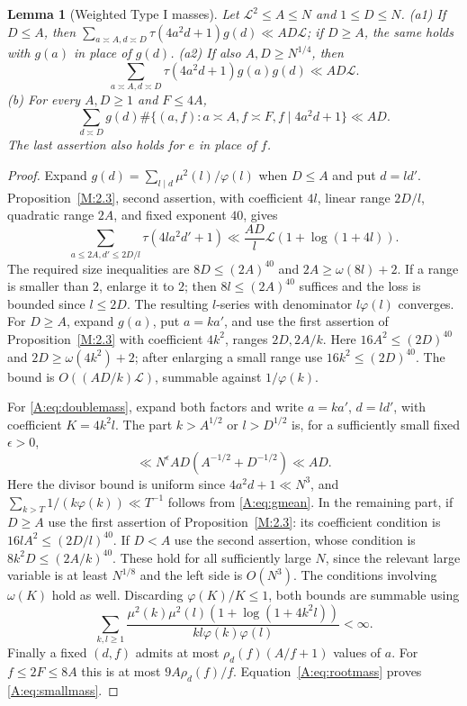 \documentclass[10pt,reqno]{amsart}
\newtheorem{lemma}[theorem]{Lemma}
\theoremstyle{definition}
\numberwithin{equation}{section}
\newcommand{\cL}{\mathcal L}
\begin{document}
\begin{lemma}[Weighted Type I masses]\label{L:8.4}
Let $\cL^2\le A\le N$ and $1\le D\le N$.
\textup{(a1)} If $D\le A$, then
$\sum_{a\asymp A,d\asymp D}\tau(4a^2d+1)g(d)\ll AD\cL$;
if $D\ge A$, the same holds with $g(a)$ in place of $g(d)$.
\textup{(a2)} If also $A,D\ge N^{1/4}$, then
\begin{equation}\label{A:eq:doublemass}
 \sum_{a\asymp A,d\asymp D}\tau(4a^2d+1)g(a)g(d)\ll AD\cL.
\end{equation}
\textup{(b)} For every $A,D\ge1$ and $F\le4A$,
\begin{equation}\label{A:eq:smallmass}
 \sum_{d\asymp D}g(d)\#\{(a,f):a\asymp A,f\asymp F,
                                    f\mid4a^2d+1\}\ll AD.
\end{equation}
The last assertion also holds for $e$ in place of $f$.
\end{lemma}
\begin{proof}
Expand $g(d)=\sum_{l\mid d}\mu^2(l)/\varphi(l)$ when $D\le A$ and put
$d=ld'$. Proposition~\ref{M:2.3}, second assertion, with coefficient $4l$,
linear range $2D/l$, quadratic range $2A$, and fixed exponent $40$, gives
\[
 \sum_{a\le2A,d'\le2D/l}\tau(4la^2d'+1)
       \ll\frac{AD}{l}\cL(1+\log(1+4l)).
\]
The required size inequalities are $8D\le(2A)^{40}$ and
$2A\ge\omega(8l)+2$. If a range is smaller than $2$, enlarge it to $2$;
then $8l\le(2A)^{40}$ suffices and the loss is bounded since $l\le2D$.
The resulting $l$-series with denominator $l\varphi(l)$ converges.
For $D\ge A$, expand $g(a)$, put $a=ka'$, and use the first assertion of
Proposition~\ref{M:2.3} with coefficient $4k^2$, ranges $2D,2A/k$.
Here $16A^2\le(2D)^{40}$ and $2D\ge\omega(4k^2)+2$; after enlarging a
small range use $16k^2\le(2D)^{40}$. The bound is
$O((AD/k)\cL)$, summable against $1/\varphi(k)$.

For \eqref{A:eq:doublemass}, expand both factors and write $a=ka'$,
$d=ld'$, with coefficient $K=4k^2l$. The part $k>A^{1/2}$ or
$l>D^{1/2}$ is, for a sufficiently small fixed $\epsilon>0$,
\[
 \ll N^\epsilon AD(A^{-1/2}+D^{-1/2})\ll AD.
\]
Here the divisor bound is uniform since $4a^2d+1\ll N^3$, and
$\sum_{k>T}1/(k\varphi(k))\ll T^{-1}$ follows from
\eqref{A:eq:gmean}. In the remaining part, if $D\ge A$ use the first
assertion of Proposition~\ref{M:2.3}: its coefficient condition is
$16lA^2\le(2D/l)^{40}$. If $D<A$ use the second assertion, whose condition
is $8k^2D\le(2A/k)^{40}$. These hold for all sufficiently large $N$,
since the relevant large variable is at least $N^{1/8}$ and the left
side is $O(N^3)$. The conditions involving $\omega(K)$ hold as well.
Discarding $\varphi(K)/K\le1$, both bounds are summable using
\[
 \sum_{k,l\ge1}\frac{\mu^2(k)\mu^2(l)(1+\log(1+4k^2l))}
                         {kl\varphi(k)\varphi(l)}<\infty.
\]
Finally a fixed $(d,f)$ admits at most $\rho_d(f)(A/f+1)$ values of $a$.
For $f\le2F\le8A$ this is at most $9A\rho_d(f)/f$.
Equation~\eqref{A:eq:rootmass} proves \eqref{A:eq:smallmass}.
\end{proof}
\end{document}

